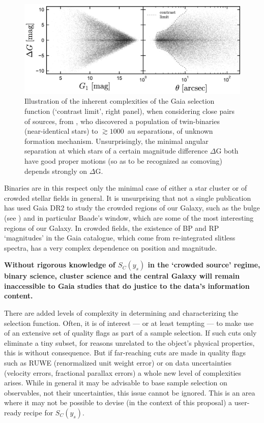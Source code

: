 \begin{figure}[ht!]
    \centering
    \includegraphics[width=0.7\linewidth]{img/BinarySelection_ElBadry.png}
    \caption{Illustration of the inherent complexities of the Gaia selection function (`contrast limit', right panel), when considering close pairs of sources, from \citet{ElBadry2019}, who discovered a population of twin-binaries (near-identical stars) to $\gtrsim 1000$~au separations, of unknown formation mechanism.
    Unsurprisingly, the minimal angular separation at which stars of a certain magnitude difference $\Delta$G both have good proper motions (so as to be recognized as comoving) depends strongly on $\Delta$G.}
    \label{fig:binaries}
\end{figure}

Binaries are in this respect only the minimal case of either a star cluster or of crowded stellar fields in general. It is unsurprising that not a single publication has used Gaia DR2 to study the crowded regions of our Galaxy, such as the bulge (see ) and in particular Baade's window, which are some of the most interesting regions of our Galaxy. In crowded fields, the existence of BP and RP `magnitudes' in the Gaia catalogue, which come from re-integrated slitless spectra, has a very complex dependence on position and magnitude.

\textbf{Without rigorous knowledge of $S_C(y_s)$ in the `crowded source' regime, binary science, cluster science and the central Galaxy will remain inaccessible to Gaia studies that do justice to the data's information content.}

There are added levels of complexity in determining and characterizing the selection function. Often, it is of interest --- or at least tempting --- to make use of an extensive set of quality flags as part of a sample selection. If such cuts only eliminate a tiny subset, for reasons unrelated to the object's physical properties, this is without consequence. But if far-reaching cuts are made in quality flags such as RUWE (renormalized unit weight error) or on data uncertainties (velocity errors, fractional parallax errors) a whole new level of complexities arises. While in general it may be advisable to base sample selection on observables, not their uncertainties, this issue cannot be ignored. This is an area where it may not be possible to devise (in the context of this proposal) a user-ready recipe for $S_C(y_s)$.

